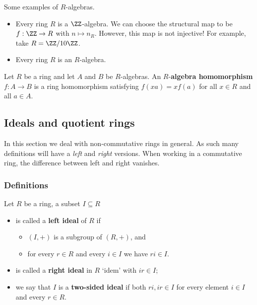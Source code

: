 \documentclass[12pt, a4paper]{article}
\begin{document}
\begin{mdexample}
    Some examples of \(R\)-algebras.
    \begin{itemize}
        \item Every ring \(R\) is a \(\ZZ\)-algebra. We can choose the structural map to be \(f:\ZZ \to R\) with \(n \mapsto n_R\). However, this map is not injective! For example, take \(R = \ZZ/10\ZZ\).
        \item Every ring \(R\) is an \(R\)-algebra.
    \end{itemize}
\end{mdexample}

\begin{definition}
    Let \(R\) be a ring and let \(A\) and \(B\) be \(R\)-algebras. An \(R\)-\textbf{algebra homomorphism} \(f:A\to B\) is a ring homomorphism satisfying \(f(xa)=xf(a)\) for all \(x \in R\) and all \(a \in A\).
\end{definition}

\subsection{Ideals and quotient rings}

In this section we deal with non-commutative rings in general. As such many definitions will have a \textit{left} and \textit{right} versions. When working in a commutative ring, the difference between left and right vanishes.

\subsubsection{Definitions}

\begin{definition}
    Let \(R\) be a ring, a subset \(I \subseteq R\) 
    \begin{itemize}
        \item is called a \textbf{left ideal} of \(R\) if 
        \begin{itemize}
            \item \((I,+)\) is a subgroup of \((R,+)\), and 
            \item for every \(r \in R\) and every \(i \in I\) we have \(ri\in I\).
        \end{itemize}
        \item is called a \textbf{right ideal} in \(R\) `idem' with \(ir \in I\);
        \item we say that \(I\) is a \textbf{two-sided ideal} if both \(ri, ir \in I\) for every element \(i \in I\) and every \(r \in R\).
    \end{itemize}
\end{definition}
\end{document}
